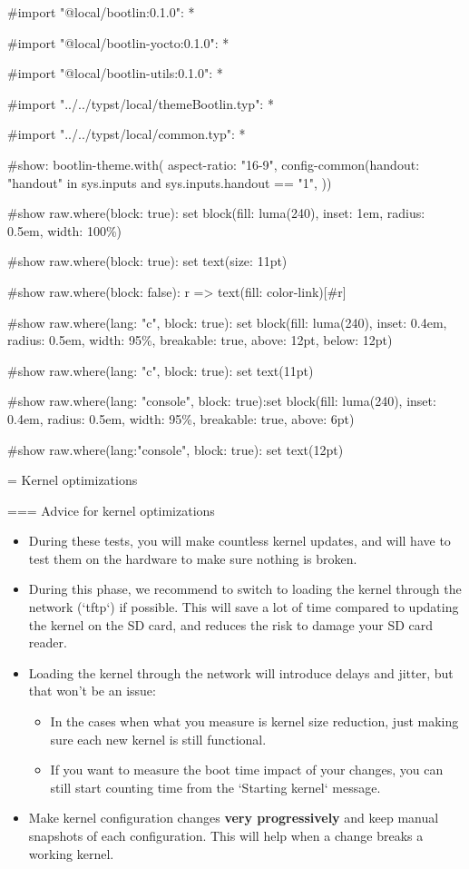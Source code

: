 #import "@local/bootlin:0.1.0": *

#import "@local/bootlin-yocto:0.1.0": *

#import "@local/bootlin-utils:0.1.0": *

#import "../../typst/local/themeBootlin.typ": *

#import "../../typst/local/common.typ": *

#show: bootlin-theme.with( aspect-ratio: "16-9", config-common(handout: "handout" in sys.inputs and sys.inputs.handout == "1", ))

#show raw.where(block: true): set block(fill: luma(240), inset: 1em, radius: 0.5em, width: 100\%)

#show raw.where(block: true): set text(size: 11pt)

#show raw.where(block: false): r => text(fill: color-link)[#r]

#show raw.where(lang: "c", block: true): set block(fill: luma(240), inset: 0.4em, radius: 0.5em, width: 95\%, breakable: true, above: 12pt, below: 12pt)

#show raw.where(lang: "c", block: true): set text(11pt)

#show raw.where(lang: "console", block: true):set block(fill: luma(240), inset: 0.4em, radius: 0.5em, width: 95\%, breakable: true, above: 6pt)

#show raw.where(lang:"console", block: true): set text(12pt)

 = Kernel optimizations

=== Advice for kernel optimizations
	\small
	\begin{itemize}
	\item During these tests, you will make countless kernel updates, and will
	      have to test them on the hardware to make sure nothing is broken.
	\item During this phase, we recommend to switch to loading the kernel through
	      the network (`tftp`) if possible. This will save a lot of time
	      compared to updating the kernel on the SD card, and reduces the risk
	      to damage your SD card reader.
	\item Loading the kernel through the network will introduce delays and jitter,
	      but that won't be an issue:
	      \begin{itemize}
	      \item In the cases when what you measure is kernel size reduction, just
		    making sure each new kernel is still functional.
	      \item If you want to measure the boot time impact of your changes,
		    you can still start counting time from the `Starting kernel`
		    message.
	      \end{itemize}
	\item Make kernel configuration changes {\bf very progressively} and keep
	      manual snapshots of each configuration. This will help when a change
	      breaks a working kernel.
	\end{itemize}


